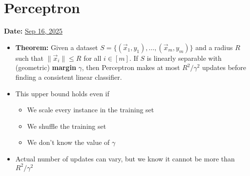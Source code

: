 \section{Perceptron}
\textbf{Date:} \underline{Sep 16, 2025}

\begin{itemize}
    \item \textbf{Theorem:} Given a dataset $S = \{(\vec{x}_1, y_1), \ldots, (\vec{x}_m, y_m)\}$ and a radius $R$ such that $\|\vec{x}_i\| \leq R$ for all $i \in [m]$. If $S$ is linearly separable with (geometric) \textbf{margin} $\gamma$, then Perceptron makes at most $R^2/\gamma^2$ updates before finding a consistent linear classifier.
    \item This upper bound holds even if
    \begin{itemize}
        \item We scale every instance in the training set
        \item We shuffle the training set
        \item We don't know the value of $\gamma$
    \end{itemize}
    \item Actual number of updates can vary, but we know it cannot be more than $R^2/\gamma^2$
\end{itemize}

